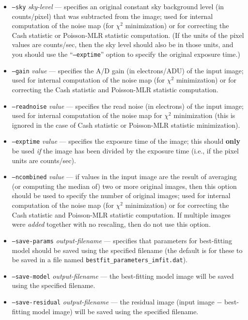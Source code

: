 \documentclass[10pt,a4paper,article]{memoir}
\newcommand{\chisquare}{\ensuremath{\chi^{2}}}
\begin{document}
\begin{itemize}
\item \texttt{--sky} \textit{sky-level} --- specifies an original constant sky background
level (in counts/pixel) that was subtracted from the image; used for internal
computation of the noise map (for \chisquare{} minimization) or for correcting the 
Cash statistic or Poisson-MLR statistic computation. (If the units of the pixel values are 
counts/sec, then the sky level should also be in those units, and you should use the 
``\texttt{--exptime}'' option to specify the original exposure time.)
\item \texttt{--gain} \textit{value} --- specifies the A/D gain (in electrons/ADU)
of the input image; used for internal computation of the noise map (for \chisquare{}
minimization) or for correcting the Cash statistic and Poisson-MLR statistic computation.
\item \texttt{--readnoise} \textit{value} --- specifies the read noise (in electrons)
of the input image; used for internal computation of the noise map for \chisquare{}
minimization (this is ignored in the case of Cash statistic or Poisson-MLR statistic minimization).
\item \texttt{--exptime} \textit{value} --- specifies the exposure time of the image;
this should \textbf{only} be used \textit{if} the image has been divided by the exposure time
(i.e., if the pixel units are counts/sec).
\item \texttt{--ncombined} \textit{value} --- if values in the input
image are the result of averaging (or computing the median of) two or
more original images, then this option should be used to specify the
number of original images; used for internal computation of the noise map (for \chisquare{}
minimization) or for correcting the Cash statistic and Poisson-MLR statistic computation.  
If multiple images were \textit{added} together with no rescaling, then do not use this option.

\bigskip

\item \texttt{--save-params} \textit{output-filename} --- specifies that parameters 
for best-fitting model should be saved using the specified filename (the default is
for these to be saved in a file named \texttt{bestfit\_parameters\_imfit.dat}).
\item \texttt{--save-model} \textit{output-filename} --- the best-fitting model image
will be saved using the specified filename.
\item \texttt{--save-residual} \textit{output-filename} --- the residual image (input
image $-$ best-fitting model image) will be saved using the specified filename.


\end{itemize}
\end{document}

